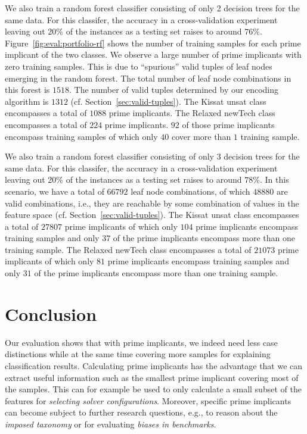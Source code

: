 \documentclass{easychair}
\theoremstyle{definition}
\begin{document}
We also train a random forest classifier consisting of only 2 decision trees for the same data. 
For this classifer, the accuracy in a cross-validation experiment leaving out 20\% of the instances as a testing set raises to around $76\%$. 
Figure~\ref{fig:eval:portfolio-rf} shows the number of training samples for each prime implicant of the two classes. 
We observe a large number of prime implicants with zero training samples. 
This is due to ``spurious'' valid tuples of leaf nodes emerging in the random forest. 
The total number of leaf node combinations in this forest is $1518$. 
The number of valid tuples determined by our encoding algorithm is $1312$ (cf. Section~\ref{sec:valid-tuples}). 
The \textsf{Kissat unsat} class encompasses a total of $1088$ prime implicants. 
The \textsf{Relaxed newTech} class encompasses a total of $224$ prime implicants. 
$92$ of those prime implicants encompass training samples of which only $40$ cover more than $1$ training sample. 

We also train a random forest classifier consisting of only 3 decision trees for the same data. 
For this classifer, the accuracy in a cross-validation experiment leaving out 20\% of the instances as a testing set raises to around $78\%$. 
In this scenario, we have a total of $66792$ leaf node combinations, of which $48880$ are valid combinations, i.e., they are reachable by some combination of values in the feature space (cf. Section~\ref{sec:valid-tuples}). 
The \textsf{Kissat unsat} class encompasses a total of $27807$ prime implicants of which only $104$ prime implicants encompass training samples and only $37$ of the prime implicants encompass more than one training sample. 
The \textsf{Relaxed newTech} class encompasses a total of $21073$ prime implicants of which only $81$ prime implicants encompass training samples and only $31$ of the prime implicants encompass more than one training sample. 

\section{Conclusion}
\label{sec:conclusion}

Our evaluation shows that with prime implicants, we indeed need less case distinctions while at the same time covering more samples for explaining classification results. 
Calculating prime implicants has the advantage that we can extract useful information such as the smallest prime implicant covering most of the samples. 
This can for example be used to only calculate a small subset of the features for \emph{selecting solver configurations}. 
Moreover, specific prime implicants can become subject to further research questions, e.g., to reason about the \emph{imposed taxonomy} or for evaluating \emph{biases in benchmarks}. 
\end{document}
